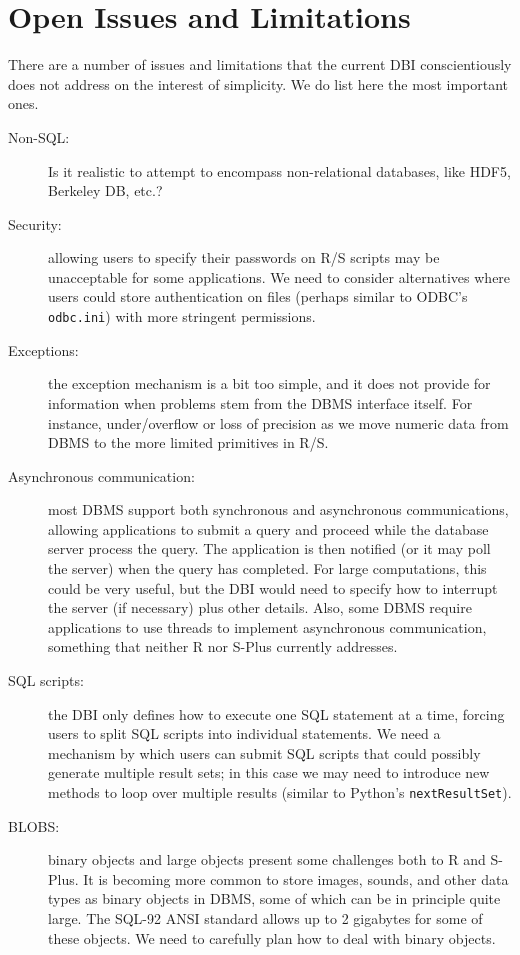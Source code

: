 \documentclass[graphics,times,psfig,dvips,hyper]{article}
\begin{document}
\section{Open Issues and Limitations}\label{sec:open-issues}
There are a number of issues and limitations that the current
DBI conscientiously does not address on the interest of simplicity.
We do list here the most important ones.
\begin{description}
\item[Non-SQL:]
  Is it realistic to attempt to encompass non-relational databases,
  like HDF5, Berkeley DB, etc.?

\item[Security:] 
  allowing users to specify their passwords on R/S scripts may
  be unacceptable for some applications.  We need to consider
  alternatives where users could store authentication on files
  (perhaps similar to ODBC's \texttt{odbc.ini}) with more stringent 
  permissions.

\item[Exceptions:]
  the exception mechanism is a bit too simple, and it does not
  provide for information when problems stem from the DBMS
  interface itself.  For instance, under/overflow or loss of
  precision as we move numeric data from DBMS to the more limited
  primitives in R/S.

\item[Asynchronous communication:]
  most DBMS support both synchronous and asynchronous communications,
  allowing applications to submit a query and proceed while
  the database server process the query. The application is then
  notified (or it may poll the server) when the query has completed.
  For large computations, this could be very useful, but the DBI
  would need to specify how to interrupt the server (if necessary)
  plus other details.  Also, some DBMS require applications to use
  threads to implement asynchronous communication, something that
  neither R nor S-Plus currently addresses.

\item[SQL scripts:]
  the DBI only defines how to execute one SQL statement at a time, 
  forcing users to split SQL scripts into individual statements.
  We need a mechanism by which users can submit SQL scripts that
  could possibly generate multiple result sets;  in this case we 
  may need to introduce new methods to loop over multiple results
  (similar to Python's \texttt{nextResultSet}).

\item[BLOBS:]
  binary objects and large objects present some challenges both
  to R and S-Plus.  It is becoming more common to store images, sounds,
  and other data types as binary objects in DBMS, some of which can
  be in principle quite large. The SQL-92 ANSI standard allows up
  to 2 gigabytes for some of these objects.  We need to carefully
  plan how to deal with binary objects.
  

\end{description}
\end{document}
